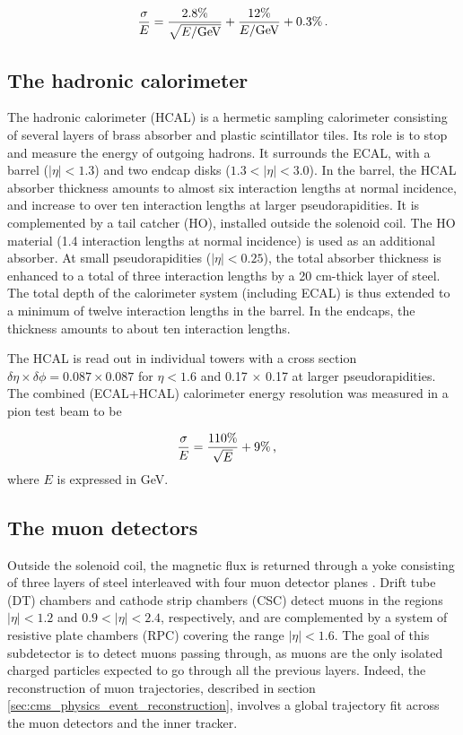 \begin{equation}
    \frac{\sigma}{E} = \frac{2.8\%}{\sqrt{E / \mathrm{GeV}}} + \frac{12\%}{E / \mathrm{GeV}} + 0.3\% \mend
\end{equation}

\subsection{The hadronic calorimeter}

The hadronic calorimeter (HCAL) \cite{CERN-LHCC-97-031} is a hermetic sampling calorimeter consisting of several layers of brass absorber and plastic scintillator tiles. Its role is to stop and measure the energy of outgoing hadrons. It surrounds the ECAL, with a barrel ($|\eta| < 1.3$) and two endcap disks ($1.3 < |\eta| < 3.0$). In the barrel, the HCAL absorber thickness amounts to almost six interaction lengths at normal incidence, and increase to over ten interaction lengths at larger pseudorapidities. It is complemented by a tail catcher (HO), installed outside the solenoid coil. The HO material (1.4 interaction lengths at normal incidence) is used as an additional absorber. At small pseudorapidities ($|\eta| < 0.25$), the total absorber thickness is enhanced to a total of three interaction lengths by a 20 cm-thick layer of steel. The total depth of the calorimeter system (including ECAL) is thus extended to a minimum of twelve interaction lengths in the barrel. In the endcaps, the thickness amounts to about ten interaction lengths.

The HCAL is read out in individual towers with a cross section $\delta\eta \times \delta\phi = 0.087 \times 0.087$ for $\eta < 1.6$ and 0.17 $\times$ 0.17 at larger pseudorapidities. The combined (ECAL+HCAL) calorimeter energy resolution was measured in a pion test beam to be 

\begin{equation}
    \frac{\sigma}{E} = \frac{110 \%}{\sqrt{E}} + 9\% \msep
\end{equation}
where $E$ is expressed in GeV.
\subsection{The muon detectors}

Outside the solenoid coil, the magnetic flux is returned through a yoke consisting of three layers of steel interleaved with four muon detector planes \cite{CERN-LHCC-97-032,collaboration_2013}. Drift tube (DT) chambers and cathode strip chambers (CSC) detect muons in the regions $|\eta| < 1.2$ and $0.9 < |\eta| < 2.4$, respectively, and are complemented by a system of resistive plate chambers (RPC) covering the range $|\eta| < 1.6$. The goal of this subdetector is to detect muons passing through, as muons are the only isolated charged particles expected to go through all the previous layers. Indeed, the reconstruction of muon trajectories, described in section \ref{sec:cms_physics_event_reconstruction}, involves a global trajectory fit across the muon detectors and the inner tracker.


